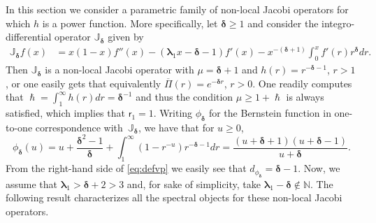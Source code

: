 \documentclass[JEP,XML,SOM,Unicode]{cedram}
\theoremstyle{plain}
\theoremstyle{definition}
\newcommand{\N}{\mathbb{N}}
\newcommand{\calJ}{\mathds{J}}
\newcommand{\lam}{{\bm{\lambda}_1}}
\newcommand{\vat}{{\mathsf{r}_1}}
\newcommand{\mm}{{\bm{\delta}}}
\let\h\hslash
\let\mo\mu
\begin{document}
In this section we consider a parametric family of non-local Jacobi operators for which $h$ is a power function. More specifically, let $\mm \geq 1$ and consider the integro-differential operator $\calJ_\mm$ given by
\begin{align*}
\calJ_{\mm} f(x) &= x(1-x)f''(x) - (\lam x - \mm-1)f'(x)- x^{-(\mm+1)}\int_0^{x} f'(r)r^{\mm}dr.
\end{align*}
Then $\calJ_\mm$ is a non-local Jacobi operator with $\mo = \mm+1$ and $h(r) = r^{-\mm-1}$, $r>1$, or one easily gets that equivalently $\overline{\Pi}(r) = e^{-\mm r}$, $r > 0$. One readily computes that $\h = \int_1^\infty h(r)dr = \mm^{-1}$ and thus the condition $\mo \geq 1+\h$ is always satisfied, which implies that $\vat = 1$. Writing $\phi_\mm$ for the Bernstein function in one-to-one correspondence with~$\calJ_\mm$, we have that for $u \geq 0$,
\begin{equation}
\label{eq:defvp}
\phi_{\mm}(u) = u + \frac{\mm^2-1}{\mm} + \int_1^\infty (1-r^{-u})r^{-\mm-1}dr = \frac{(u+\mm+1)(u+\mm-1)}{u + \mm}.\end{equation}
From the right-hand side of \eqref{eq:defvp} we easily see that $d_{\phi_\mm} = \mm-1$. Now, we assume that $\lam >\mm+2 > 3$ and, for sake of simplicity, take $\lam - \mm \not\in \N$. The following result characterizes all the spectral objects for these non-local Jacobi operators.
\end{document}
